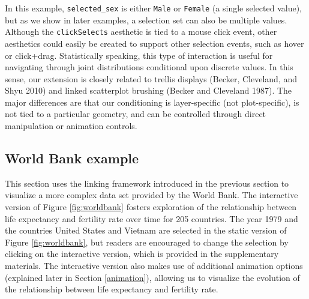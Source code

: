 \documentclass[12pt,]{article}
\theoremstyle{definition}
\theoremstyle{definition}
\theoremstyle{definition}
\theoremstyle{remark}
\begin{document}
In this example, \texttt{selected\_sex} is either \texttt{Male} or
\texttt{Female} (a single selected value), but as we show in later
examples, a selection set can also be multiple values. Although the
\texttt{clickSelects} aesthetic is tied to a mouse click event, other
aesthetics could easily be created to support other selection events,
such as hover or click+drag. Statistically speaking, this type of
interaction is useful for navigating through joint distributions
conditional upon discrete values. In this sense, our extension is
closely related to trellis displays (Becker, Cleveland, and Shyu 2010)
and linked scatterplot brushing (Becker and Cleveland 1987). The major
differences are that our conditioning is layer-specific (not
plot-specific), is not tied to a particular geometry, and can be
controlled through direct manipulation or animation controls.

\hypertarget{worldbank}{%
\subsection{World Bank example}\label{worldbank}}

This section uses the linking framework introduced in the previous
section to visualize a more complex data set provided by the World Bank.
The interactive version of Figure \ref{fig:worldbank} fosters
exploration of the relationship between life expectancy and fertility
rate over time for 205 countries. The year 1979 and the countries United
States and Vietnam are selected in the static version of Figure
\ref{fig:worldbank}, but readers are encouraged to change the selection
by clicking on the interactive version, which is provided in the
supplementary materials. The interactive version also makes use of
additional animation options (explained later in Section
\ref{animation}), allowing us to visualize the evolution of the
relationship between life expectancy and fertility rate.
\end{document}

